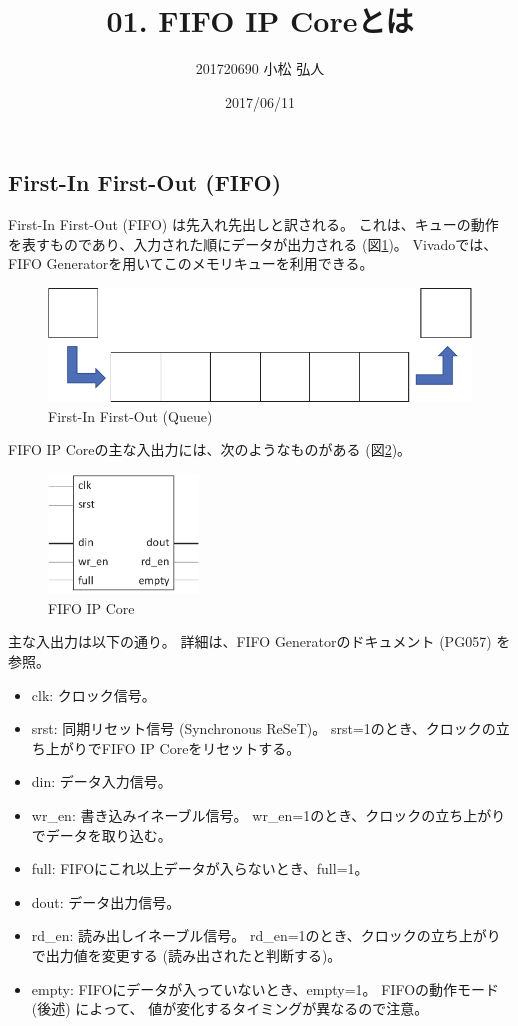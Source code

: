 \documentclass[11pt]{jsarticle}
\title{01. FIFO IP Coreとは}
\author{201720690 小松 弘人}
\date{2017/06/11}
\begin{document}
\maketitle
\subsection*{First-In First-Out (FIFO)}

First-In First-Out (FIFO) は先入れ先出しと訳される。
これは、キューの動作を表すものであり、入力された順にデータが出力される
(図\ref{img:queue})。
Vivadoでは、FIFO Generatorを用いてこのメモリキューを利用できる。

\begin{figure}[ht]
	\centering
	\includegraphics[width=0.6\linewidth]{img/queue.pdf}
	\caption{First-In First-Out (Queue)}
	\label{img:queue}
\end{figure}

\vspace{-0.3cm}

FIFO IP Coreの主な入出力には、次のようなものがある (図\ref{img:fifo_ip})。
\begin{figure}[ht]
	\centering
	\includegraphics[width=4cm]{img/fifo_ip.pdf}
	\caption{FIFO IP Core}
	\label{img:fifo_ip}
\end{figure}

\vspace{-0.3cm}

主な入出力は以下の通り。
詳細は、FIFO Generatorのドキュメント (PG057) を参照。
\begin{itemize}
	\item
		clk:
		クロック信号。
	\item
		srst:
		同期リセット信号 (Synchronous ReSeT)。
		srst=1のとき、クロックの立ち上がりでFIFO IP Coreをリセットする。
	\item
		din:
		データ入力信号。
	\item
		wr\_en:
		書き込みイネーブル信号。
		wr\_en=1のとき、クロックの立ち上がりでデータを取り込む。
	\item
		full:
		FIFOにこれ以上データが入らないとき、full=1。
	\item
		dout:
		データ出力信号。
	\item
		rd\_en:
		読み出しイネーブル信号。
		rd\_en=1のとき、クロックの立ち上がりで出力値を変更する
		(読み出されたと判断する)。
	\item
		empty:
		FIFOにデータが入っていないとき、empty=1。
		FIFOの動作モード (後述) によって、
		値が変化するタイミングが異なるので注意。
\end{itemize}
\end{document}

